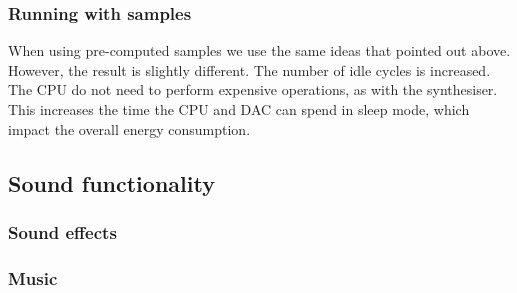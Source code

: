 \subsubsection{Running with samples}
When using pre-computed samples we use the same ideas that pointed out above. However, the result is slightly different. The number of idle cycles is increased. The CPU do not need to perform expensive operations, as with the synthesiser. This increases the time the CPU and DAC can spend in sleep mode, which impact the overall energy consumption.   





\subsection{Sound functionality}



\subsubsection{Sound effects}


\subsubsection{Music}


